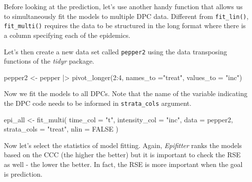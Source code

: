 \documentclass[
  letterpaper,
  DIV=11,
  numbers=noendperiod]{scrreprt}
\newenvironment{Shaded}{\begin{snugshade}}{\end{snugshade}}
\newcommand{\AttributeTok}[1]{\textcolor[rgb]{0.40,0.45,0.13}{#1}}
\newcommand{\ConstantTok}[1]{\textcolor[rgb]{0.56,0.35,0.01}{#1}}
\newcommand{\DecValTok}[1]{\textcolor[rgb]{0.68,0.00,0.00}{#1}}
\newcommand{\FunctionTok}[1]{\textcolor[rgb]{0.28,0.35,0.67}{#1}}
\newcommand{\NormalTok}[1]{\textcolor[rgb]{0.00,0.23,0.31}{#1}}
\newcommand{\OtherTok}[1]{\textcolor[rgb]{0.00,0.23,0.31}{#1}}
\newcommand{\SpecialCharTok}[1]{\textcolor[rgb]{0.37,0.37,0.37}{#1}}
\newcommand{\StringTok}[1]{\textcolor[rgb]{0.13,0.47,0.30}{#1}}
\begin{document}
Before looking at the prediction, let's use another handy function that
allows us to simultaneously fit the models to multiple DPC data.
Different from \texttt{fit\_lin()}, \texttt{fit\_multi()} requires the
data to be structured in the long format where there is a column
specifying each of the epidemics.

Let's then create a new data set called \texttt{pepper2} using the data
transposing functions of the \emph{tidyr} package.

\begin{Shaded}
\begin{Highlighting}[]
\NormalTok{pepper2 }\OtherTok{\textless{}{-}}\NormalTok{ pepper }\SpecialCharTok{|\textgreater{}} 
  \FunctionTok{pivot\_longer}\NormalTok{(}\DecValTok{2}\SpecialCharTok{:}\DecValTok{4}\NormalTok{, }\AttributeTok{names\_to =}\StringTok{"treat"}\NormalTok{, }\AttributeTok{values\_to =} \StringTok{"inc"}\NormalTok{)}
\end{Highlighting}
\end{Shaded}

Now we fit the models to all DPCs. Note that the name of the variable
indicating the DPC code needs to be informed in \texttt{strata\_cols}
argument.

\begin{Shaded}
\begin{Highlighting}[]
\NormalTok{epi\_all }\OtherTok{\textless{}{-}} \FunctionTok{fit\_multi}\NormalTok{(}
  \AttributeTok{time\_col =} \StringTok{"t"}\NormalTok{,}
  \AttributeTok{intensity\_col =} \StringTok{"inc"}\NormalTok{,}
  \AttributeTok{data =}\NormalTok{ pepper2,}
  \AttributeTok{strata\_cols =} \StringTok{"treat"}\NormalTok{,}
  \AttributeTok{nlin =} \ConstantTok{FALSE}
\NormalTok{)}
\end{Highlighting}
\end{Shaded}

Now let's select the statistics of model fitting. Again,
\emph{Epifitter} ranks the models based on the CCC (the higher the
better) but it is important to check the RSE as well - the lower the
better. In fact, the RSE is more important when the goal is prediction.

\begin{Shaded}
\end{Shaded}
\end{document}
